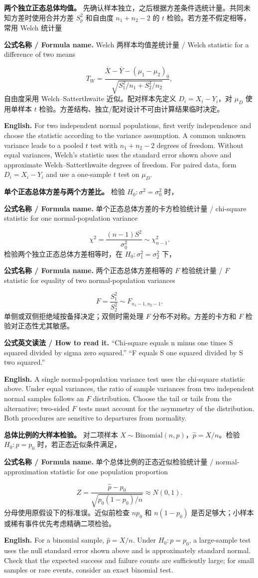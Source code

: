 \documentclass[UTF8,11pt,a4paper]{ctexart}
\newcommand{\EN}[1]{\par\noindent\textbf{English.} #1\par}
\newcommand{\READ}[1]{\par\noindent\textbf{公式英文读法 / How to read it.} #1\par}
\newcommand{\FORMULA}[2]{\par\noindent\textbf{公式名称 / Formula name.} #1 / #2\par}
\begin{document}
\noindent\textbf{两个独立正态总体均值。} 先确认样本独立，之后根据方差条件选统计量。共同未知方差时使用合并方差 $S_p^2$ 和自由度 $n_1+n_2-2$ 的 $t$ 检验。若方差不假定相等，常用 Welch 统计量
\FORMULA{Welch 两样本均值差统计量}{Welch statistic for a difference of two means}
\[
T_W=\frac{\bar X-\bar Y-(\mu_1-\mu_2)_0}
{\sqrt{S_1^2/n_1+S_2^2/n_2}},
\]
自由度采用 Welch--Satterthwaite 近似。配对样本先定义 $D_i=X_i-Y_i$，对 $\mu_D$ 使用单样本 $t$ 检验。方差结构、独立/配对设计不可由计算结果临时决定。
\EN{For two independent normal populations, first verify independence and choose the statistic according to the variance assumption. A common unknown variance leads to a pooled $t$ test with $n_1+n_2-2$ degrees of freedom. Without equal variances, Welch's statistic uses the standard error shown above and approximate Welch--Satterthwaite degrees of freedom. For paired data, form $D_i=X_i-Y_i$ and use a one-sample $t$ test on $\mu_D$.}

\noindent\textbf{单个正态总体方差与两个方差比。} 检验 $H_0:\sigma^2=\sigma_0^2$ 时，
\FORMULA{单个正态总体方差的卡方检验统计量}{chi-square statistic for one normal-population variance}
\[
\chi^2=\frac{(n-1)S^2}{\sigma_0^2}\sim\chi^2_{n-1}.
\]
检验两个独立正态总体方差相等时，在 $H_0:\sigma_1^2=\sigma_2^2$ 下，
\FORMULA{两个正态总体方差相等的 $F$ 检验统计量}{$F$ statistic for equality of two normal-population variances}
\[
F=\frac{S_1^2}{S_2^2}\sim F_{n_1-1,n_2-1}.
\]
单侧或双侧拒绝域按备择决定；双侧时需处理 $F$ 分布不对称。方差的卡方和 $F$ 检验对正态性尤其敏感。
\READ{“Chi-square equals n minus one times S squared divided by sigma zero squared.” “F equals S one squared divided by S two squared.”}
\EN{A single normal-population variance test uses the chi-square statistic above. Under equal variances, the ratio of sample variances from two independent normal samples follows an $F$ distribution. Choose the tail or tails from the alternative; two-sided $F$ tests must account for the asymmetry of the distribution. Both procedures are sensitive to departures from normality.}

\noindent\textbf{总体比例的大样本检验。} 对二项样本 $X\sim\mathrm{Binomial}(n,p)$，$\hat p=X/n$。检验 $H_0:p=p_0$ 时，若正态近似条件满足，
\FORMULA{单个总体比例的正态近似检验统计量}{normal-approximation statistic for one population proportion}
\[
Z=\frac{\hat p-p_0}{\sqrt{p_0(1-p_0)/n}}\approx N(0,1).
\]
分母使用原假设下的标准误。近似前检查 $np_0$ 和 $n(1-p_0)$ 是否足够大；小样本或稀有事件优先考虑精确二项检验。
\EN{For a binomial sample, $\hat p=X/n$. Under $H_0:p=p_0$, a large-sample test uses the null standard error shown above and is approximately standard normal. Check that the expected success and failure counts are sufficiently large; for small samples or rare events, consider an exact binomial test.}
\end{document}
